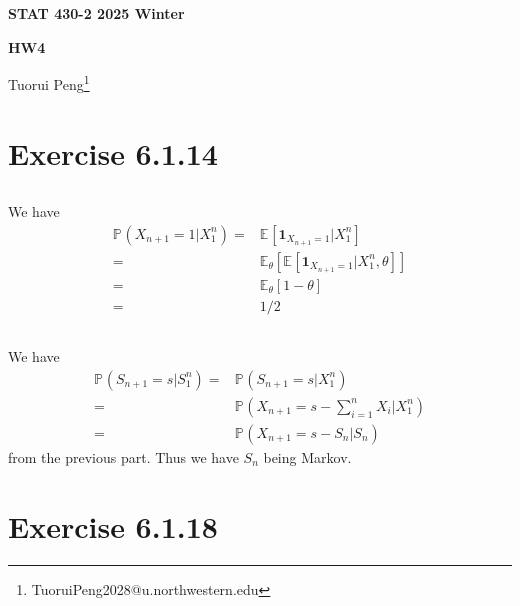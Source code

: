 \documentclass[11pt,a4paper]{ctexart}
\numberwithin{equation}{section}%
\begin{document}
\begin{center}\thispagestyle{plain}

{\LARGE\textbf{STAT 430-2 2025 Winter}}

{\Large\textbf{HW4}}

Tuorui Peng\footnote{TuoruiPeng2028@u.northwestern.edu}
\end{center}

\thispagestyle{myheadings}
\pagestyle{myheadings}





\section{Exercise 6.1.14}

\subsection{}
We have
\begin{align*}
    \mathbb{P}_{  }\left( X_{n+1}=1|X_1^n \right) =& \mathbb{E}_{  }\left[ \mathbf{1}_{X_{n+1}=1} | X_1^n \right]  \\
    =& \mathbb{E}_{ \theta  }\left[ \mathbb{E}_{  }\left[ \mathbf{1}_{X_{n+1}=1} | X_1^n, \theta  \right] \right]  \\
    =& \mathbb{E}_{ \theta  }\left[ 1-\theta  \right] \\
    =& 1/2
\end{align*}

\subsection{}

We have 
\begin{align*}
    \mathbb{P}_{  }\left( S_{n+1}=s | S_1^n \right) =& \mathbb{P}_{  }\left( S_{n+1} = s | X_1^n \right)  \\
    =& \mathbb{P}_{  }\left( X_{n+1} = s- \sum_{i=1}^n X_i | X_1^n \right)\\
    =& \mathbb{P}_{  }\left( X_{n+1} = s- S_n | S_n \right)   
\end{align*}
from the previous part. Thus we have $ S_n $ being Markov.


\section{Exercise 6.1.18}
\end{document}

